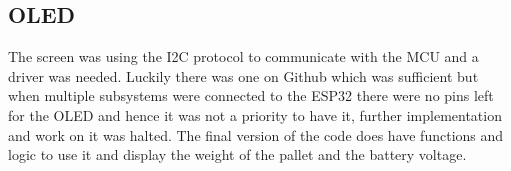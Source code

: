 \documentclass[../report.tex]{subfiles}
\begin{document}
\subsection{OLED}
The screen was using the I2C protocol to communicate with the MCU and a driver was needed. Luckily there was one on Github which was sufficient but when multiple subsystems
were connected to the ESP32 there were no pins left for the OLED and hence it was not a priority to have it, further implementation and work
on it was halted. The final version of the code does have functions and logic to use it and display the weight of the pallet
and the battery voltage.
\end{document}
